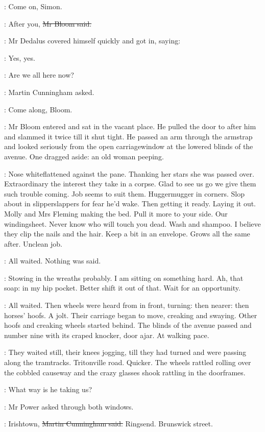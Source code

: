 \power:
Come on, Simon.

\Bloom:
After you,
\sout{Mr Bloom said.}

:
Mr Dedalus covered himself quickly and got in, saying:

\simon:
Yes, yes.

\cunningham:
Are we all here now?

:
Martin Cunningham asked.

\cunningham:
Come along, Bloom.

:
Mr Bloom entered and sat in the vacant place.
He pulled the door to after him
and slammed it twice till it shut tight.
He passed an arm through the armstrap
and looked seriously from the open carriagewindow
at the lowered blinds of the avenue.
One dragged aside:
an old woman peeping.

\BloomInt:
Nose whiteflattened against the pane.
Thanking her stars she was passed over.
Extraordinary the interest they take in a corpse.
Glad to see us go
we give them such trouble coming.
Job seems to suit them.
Huggermugger in corners.
Slop about in slipperslappers for fear he'd wake.
Then getting it ready.
Laying it out.
Molly and Mrs Fleming making the bed.
Pull it more to your side.
Our windingsheet.
Never know who will touch you dead.
Wash and shampoo.
I believe they clip the nails and the hair.
Keep a bit in an envelope.
Grows all the same after.
Unclean job.

:
All waited.
Nothing was said.

\BloomInt:
Stowing in the wreaths probably.
I am sitting on something hard.
Ah, that soap:
in my hip pocket.
Better shift it out of that.
Wait for an opportunity.

:
All waited.
Then wheels were heard from in front, turning:
then nearer:
then horses' hoofs.
A jolt.
Their carriage began to move, creaking and swaying.
Other hoofs and creaking wheels started behind.
The blinds of the avenue passed
and number nine with its craped knocker, door ajar.
At walking pace.

:
They waited still, their knees jogging, till they had turned
and were passing along the tramtracks.
Tritonville road.
Quicker.
The wheels
rattled rolling over the cobbled causeway
and the crazy glasses shook rattling in the doorframes.

\power:
What way is he taking us?

:
Mr Power asked through both windows.

\cunningham:
Irishtown,
\sout{Martin Cunningham said.}
Ringsend.
Brunswick street.

